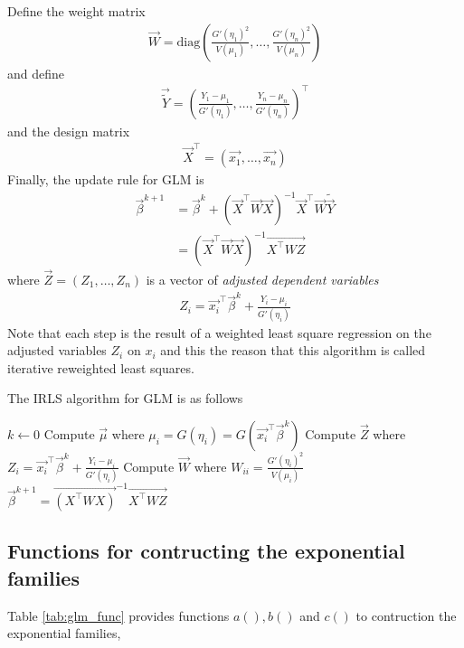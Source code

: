 Define the weight matrix
\begin{align*}
\vec{W} = \text{diag}\left( \frac{G'(\eta_{1})^2}{V(\mu_{1})}, \dots, \frac{G'(\eta_{n})^2}{V(\mu_{n})} \right)
\end{align*}
and define
\begin{align*}
\vec{\tilde{Y}} = \left(\frac{Y_1 - \mu_1}{G'(\eta_{1})}, \dots, \frac{Y_n - \mu_{n}}{G'(\eta_{n})}\right)^\top
\end{align*}
and the design matrix
\begin{align*}
\vec{X}^\top = \left(\vec{x_1}, \dots, \vec{x_n}\right)
\end{align*}
Finally, the update rule for GLM is
\begin{align*}
\vec{\beta}^{k+1}  &= \vec{\beta}^{k} + (\vec{X}^\top \vec{W} \vec{X})^{-1}\vec{X}^\top \vec{W}\tilde{\vec{Y}} \\
&= (\vec{X}^\top \vec{W} \vec{X})^{-1}\vec{X^\top WZ}
\end{align*}
where  $\vec{Z} = (Z_1, \dots, Z_n)$ is a vector of \emph{adjusted dependent variables}
\begin{align*}
Z_i = \vec{x_i}^\top \vec{\beta}^{k} + \frac{Y_i - \mu_{i}}{G'(\eta_{i})}
\end{align*}
Note that each step is the result of a weighted least square regression on the adjusted variables $Z_i$ on $x_i$ and this the reason that this algorithm is called iterative reweighted least squares.

The IRLS algorithm for GLM is as follows
\begin{algorithm}
\begin{algorithmic}[1]
    \State $k \leftarrow 0$
    \Repeat
        \State Compute $\vec{\mu}$ where $\mu_{i} = G(\eta_{i}) = G(\vec{x_i}^\top \vec{\beta}^{k})$
        \State Compute $\vec{Z}$ where $Z_i = \vec{x_i}^\top \vec{\beta}^{k} + \frac{Y_i - \mu_{i}}{G'(\eta_{i})}$
        \State Compute $\vec{W}$ where $W_{ii} = \frac{G'(\eta_{i})^2}{V(\mu_{i})}$
        \State $\vec{\beta}^{k+1} = \vec{(X^\top W X)}^{-1} \vec{X^\top WZ}$
\end{algorithmic}
\label{alg:IRLS}
\end{algorithm}

\subsection{Functions for contructing the exponential families}
Table \ref{tab:glm_func} \cite{fox2008applied} provides functions $a(), b()$ and $c()$ to contruction the exponential families,

